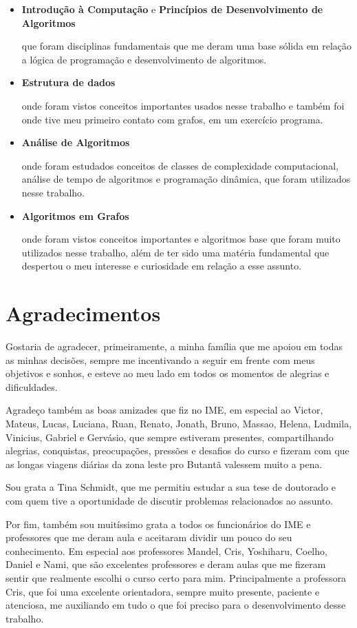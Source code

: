\documentclass[a4paper,12pt]{article}
\begin{document}
\begin{itemize}
	\item \textbf{Introdução à Computação} e 
	\textbf{Princípios de Desenvolvimento de Algoritmos}


		que foram disciplinas fundamentais que me deram  
		 uma base sólida em relação
		a lógica de programação e desenvolvimento de algoritmos.

	\item \textbf{Estrutura de dados}

		onde foram vistos conceitos importantes usados 
		nesse trabalho e também foi
		onde tive meu primeiro contato com grafos,
		em um exercício programa.
		
	\item \textbf{Análise de Algoritmos}

		onde foram estudados conceitos de classes de complexidade computacional,
		análise de tempo de algoritmos e programação dinâmica, que foram
		utilizados nesse trabalho.

	\item \textbf{Algoritmos em Grafos}
	
		onde foram vistos conceitos importantes e algoritmos 
		base que foram muito utilizados nesse trabalho, 
		além de ter sido uma matéria fundamental que despertou o meu interesse 
		e curiosidade em relação a esse assunto.
\end{itemize}

\newpage

\section{Agradecimentos}
Gostaria de agradecer, primeiramente, a minha família
que me apoiou em todas as minhas decisões, sempre
me incentivando a seguir em frente com meus objetivos e sonhos,
e esteve ao meu lado em todos os momentos de alegrias e dificuldades.

Agradeço também as boas amizades que fiz no IME, em especial
ao Victor, Mateus, Lucas, Luciana, Ruan, Renato, Jonath, Bruno, Massao, 
Helena, Ludmila, Vinicius, Gabriel e Gervásio, que sempre 
estiveram presentes, compartilhando
alegrias, conquistas, preocupações, pressões e desafios do curso
e fizeram com que as longas viagens diárias da zona leste pro Butantã 
valessem muito a pena.

Sou grata a Tina Schmidt, que me permitiu estudar a sua tese de doutorado e
com quem tive a oportunidade de discutir problemas relacionados ao assunto.

Por fim, também sou muitíssimo grata a todos os funcionários do IME e professores que
me deram aula e aceitaram dividir um pouco do seu conhecimento.
Em especial aos professores Mandel, Cris, Yoshiharu, Coelho, Daniel e Nami, que são excelentes
professores e deram aulas que me fizeram sentir que realmente 
escolhi o curso certo para mim.
Principalmente a professora Cris, que foi uma excelente orientadora,
sempre muito presente, paciente e atenciosa, me auxiliando em tudo
o que foi preciso para o desenvolvimento desse trabalho.
\end{document}
